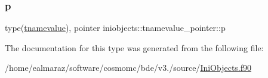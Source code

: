 \subsubsection{\texorpdfstring{p}{p}}
{\footnotesize\ttfamily type(\mbox{\hyperlink{structiniobjects_1_1tnamevalue}{tnamevalue}}), pointer iniobjects\+::tnamevalue\+\_\+pointer\+::p\hspace{0.3cm}{\ttfamily [private]}}



The documentation for this type was generated from the following file\+:\begin{DoxyCompactItemize}
\item 
/home/ealmaraz/software/cosmomc/bde/v3./source/\mbox{\hyperlink{IniObjects_8f90}{Ini\+Objects.\+f90}}\end{DoxyCompactItemize}
